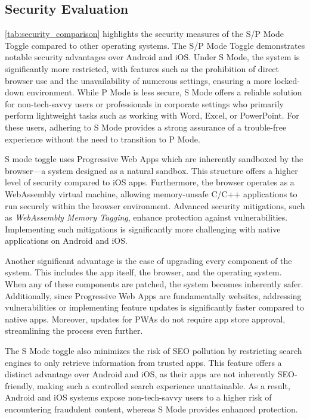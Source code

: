 \subsection{Security Evaluation}

\autoref{tab:security_comparison} highlights the security measures of the S/P Mode Toggle compared to other operating systems. The S/P Mode Toggle demonstrates notable security advantages over Android and iOS. Under S Mode, the system is significantly more restricted, with features such as the prohibition of direct browser use and the unavailability of numerous settings, ensuring a more locked-down environment. While P Mode is less secure, S Mode offers a reliable solution for non-tech-savvy users or professionals in corporate settings who primarily perform lightweight tasks such as working with Word, Excel, or PowerPoint. For these users, adhering to S Mode provides a strong assurance of a trouble-free experience without the need to transition to P Mode.

S mode toggle uses Progressive Web Apps which are inherently sandboxed by the browser—a system designed as a natural sandbox. This structure offers a higher level of security compared to iOS apps. Furthermore, the browser operates as a WebAssembly virtual machine, allowing memory-unsafe C/C++ applications to run securely within the browser environment. Advanced security mitigations, such as \textit{WebAssembly Memory Tagging}\cite{webassemblymemorytagging}, enhance protection against vulnerabilities. Implementing such mitigations is significantly more challenging with native applications on Android and iOS.

Another significant advantage is the ease of upgrading every component of the system. This includes the app itself, the browser, and the operating system. When any of these components are patched, the system becomes inherently safer. Additionally, since Progressive Web Apps are fundamentally websites, addressing vulnerabilities or implementing feature updates is significantly faster compared to native apps. Moreover, updates for PWAs do not require app store approval, streamlining the process even further.

The S Mode toggle also minimizes the risk of SEO pollution by restricting search engines to only retrieve information from trusted apps. This feature offers a distinct advantage over Android and iOS, as their apps are not inherently SEO-friendly, making such a controlled search experience unattainable. As a result, Android and iOS systems expose non-tech-savvy users to a higher risk of encountering fraudulent content, whereas S Mode provides enhanced protection.


